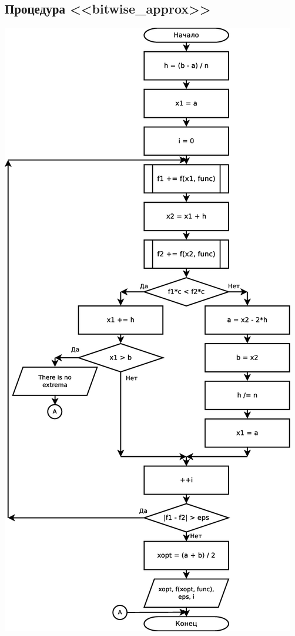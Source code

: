 \documentclass[a4paper]{article}
\begin{document}
\subsection{Процедура <<bitwise\_approx>>}
\includegraphics[scale=0.35]{schemes/bitwise_approx}
\end{document}

